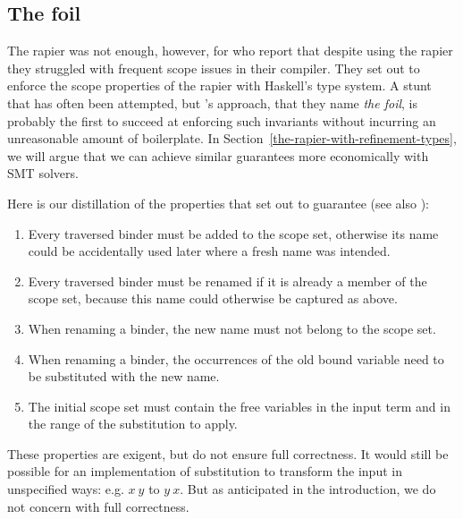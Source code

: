 \documentclass[sigconf, review]{acmart}
\begin{document}
\subsection{The foil}
\label{the-rapier-with-stronger-types}

The rapier was not enough, however, for \citet{maclaurin23} who report that
despite using the rapier they struggled with frequent scope issues in their
compiler. They set out to enforce the scope properties of the rapier with
Haskell's type system. A stunt that has often been attempted, but
\citeauthor{maclaurin23}'s approach, that they name \emph{the foil}, is probably the
first to succeed at enforcing such invariants without incurring an unreasonable
amount of boilerplate.
In Section~\ref{the-rapier-with-refinement-types}, we will argue that we can
achieve similar guarantees more economically with SMT solvers.

Here is our distillation of the properties that \citeauthor{maclaurin23} set
out to guarantee (see also \cite[Section~4]{maclaurin23}):
\begin{enumerate}
\item Every traversed binder must be added to the scope set, otherwise its name
      could be accidentally used later where a fresh name was intended.
\item \label{req:always-rename} Every traversed binder must be renamed if it is already a member of the
      scope set, because this name could otherwise be captured as above.
\item When renaming a binder, the new name must not belong to the scope set.
\item When renaming a binder, the occurrences of the old bound variable need
      to be substituted with the new name.
\item The initial scope set must contain the free variables in the input term
      and in the range of the substitution to apply.
\end{enumerate}

These properties are exigent, but do not ensure full correctness.
It would still be possible for an implementation of substitution to transform the
input in unspecified ways: e.g. $x\ y$ to $y\ x$. But as anticipated in the
introduction, we do not concern with full correctness.
\end{document}
